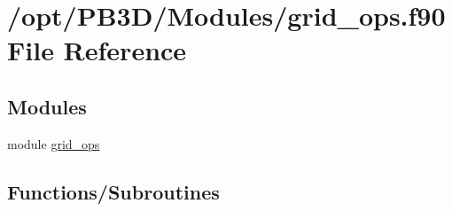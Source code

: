 \hypertarget{grid__ops_8f90}{}\section{/opt/\+P\+B3\+D/\+Modules/grid\+\_\+ops.f90 File Reference}
\label{grid__ops_8f90}
\subsection*{Modules}
\begin{DoxyCompactItemize}
\item 
module \hyperlink{namespacegrid__ops}{grid\+\_\+ops}
\end{DoxyCompactItemize}
\subsection*{Functions/\+Subroutines}
